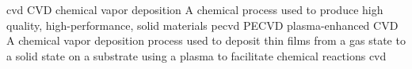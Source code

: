 \newglsXacronym%
{cvd}%
{CVD}%
{chemical vapor deposition}%
{A chemical process used to produce high quality, high-performance, solid materials}%
\newglsXacronym%
{pecvd}%
{PECVD}%
{plasma{\--}enhanced CVD}%
{A chemical vapor deposition process used to deposit thin films from a gas state to a solid state on a substrate using a plasma to facilitate chemical reactions}%
{cvd}%